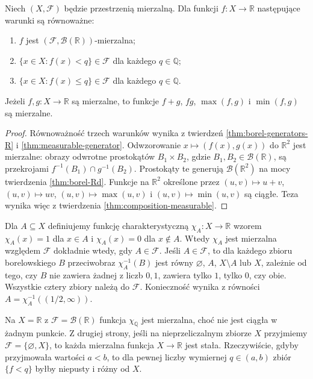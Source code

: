 \begin{twierdzenie}
\label{thm:measurable-real}
Niech $(X,\mathcal F)$ będzie przestrzenią mierzalną.
Dla funkcji $f:X\to\mathbb R$ następujące warunki są równoważne:
\begin{enumerate}
\item $f$ jest $(\mathcal F,\mathcal B(\mathbb R))$-mierzalna;
\item $\{x\in X:f(x)<q\}\in\mathcal F$ dla każdego $q\in\mathbb Q$;
\item $\{x\in X:f(x)\leq q\}\in\mathcal F$ dla każdego $q\in\mathbb Q$.
\end{enumerate}
Jeżeli $f,g:X\to\mathbb R$ są mierzalne, to funkcje
$f+g$, $fg$, $\max(f,g)$ i $\min(f,g)$ są mierzalne.
\end{twierdzenie}
\begin{proof}
Równoważność trzech warunków wynika z twierdzeń
\ref{thm:borel-generators-R} i \ref{thm:measurable-generator}.
Odwzorowanie $x\mapsto(f(x),g(x))$ do $\mathbb R^2$ jest mierzalne:
obrazy odwrotne prostokątów $B_1\times B_2$, gdzie
$B_1,B_2\in\mathcal B(\mathbb R)$, są przekrojami
$f^{-1}(B_1)\cap g^{-1}(B_2)$. Prostokąty te generują
$\mathcal B(\mathbb R^2)$ na mocy twierdzenia
\ref{thm:borel-Rd}. Funkcje na $\mathbb R^2$ określone przez
$(u,v)\mapsto u+v$, $(u,v)\mapsto uv$,
$(u,v)\mapsto\max(u,v)$ i $(u,v)\mapsto\min(u,v)$ są ciągłe.
Teza wynika więc z twierdzenia \ref{thm:composition-measurable}.
\end{proof}

\begin{przyklad}
Dla $A\subseteq X$ definiujemy funkcję charakterystyczną
$\chi_A:X\to\mathbb R$ wzorem
$\chi_A(x)=1$ dla $x\in A$ i $\chi_A(x)=0$ dla $x\notin A$.
Wtedy $\chi_A$ jest mierzalna względem $\mathcal F$
dokładnie wtedy, gdy $A\in\mathcal F$.
Jeśli $A\in\mathcal F$, to dla każdego zbioru borelowskiego $B$
przeciwobraz $\chi_A^{-1}(B)$ jest równy $\varnothing$, $A$,
$X\setminus A$ lub $X$, zależnie od tego, czy $B$ nie zawiera
żadnej z liczb $0,1$, zawiera tylko $1$, tylko $0$, czy obie.
Wszystkie cztery zbiory należą do $\mathcal F$.
Konieczność wynika z równości
$A=\chi_A^{-1}((1/2,\infty))$.
\end{przyklad}

\begin{przyklad}
Na $X=\mathbb R$ z $\mathcal F=\mathcal B(\mathbb R)$ funkcja
$\chi_{\mathbb Q}$ jest mierzalna, choć nie jest ciągła
w żadnym punkcie. Z drugiej strony, jeśli na nieprzeliczalnym
zbiorze $X$ przyjmiemy $\mathcal F=\{\varnothing,X\}$, to
każda mierzalna funkcja $X\to\mathbb R$ jest stała. Rzeczywiście,
gdyby przyjmowała wartości $a<b$, to dla pewnej liczby wymiernej
$q\in(a,b)$ zbiór $\{f<q\}$ byłby niepusty i różny od $X$.
\end{przyklad}

